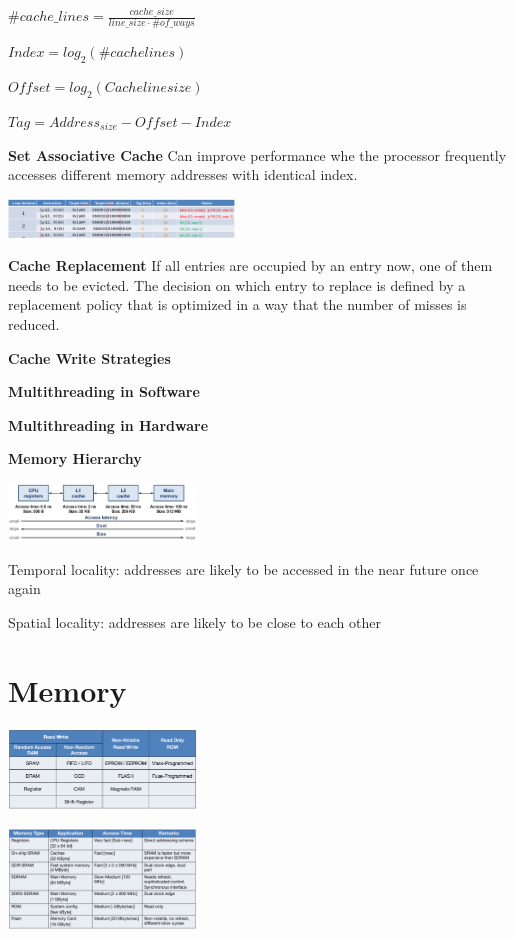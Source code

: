 \documentclass[english]{latex4ei/latex4ei_sheet}
\begin{document}
$\#cache\_lines = \frac{cache\_size}{line\_size \cdot \#of\_ways}$

$Index = log_2(\#cache lines)$

$Offset = log_2(Cache line size)$

$Tag = Address_{size} - Offset - Index$

\textbf{Set Associative Cache}
Can improve performance whe the processor frequently accesses different memory addresses with identical index.
\begin{center}
    \includegraphics[width = 6cm]{images/4.ProcessorArchitecture/SetAcCache.png}
\end{center}

\textbf{Cache Replacement}
If all entries are occupied by an entry now, one of them needs to be evicted. The decision on which entry to replace is defined by a replacement policy that is optimized in a way that the number of misses is reduced.

\textbf{Cache Write Strategies}

\textbf{Multithreading in Software}

\textbf{Multithreading in Hardware}
 


\textbf{Memory Hierarchy} 

\begin{center}
    \includegraphics[width = 5cm]{images/4.ProcessorArchitecture/MemoryHierarchy.png}
\end{center}

Temporal locality: addresses are likely to be accessed in the near future once again

Spatial locality: addresses are likely to be close to each other

\section{Memory}
\begin{center}
    \includegraphics[width=5cm]{images/5.Memory/MemoryClassificatoin.png}
\end{center}
\begin{center}
    \includegraphics[width=5cm]{images/5.Memory/MemoryCharacteristics.png}
\end{center}
\end{document}
